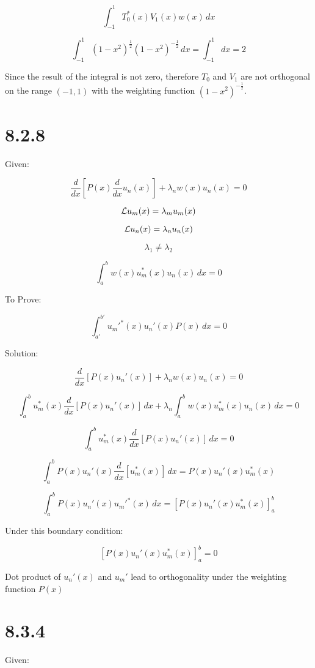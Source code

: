 \documentclass[12pt]{article}
\begin{document}
\[
    \int^1_{-1} T^*_0(x) V_1(x) w(x)\, dx
\]

\[
    \int^1_{-1} {(1-x^2)}^{\frac{1}{2}} {(1-x^2)}^{-\frac{1}{2}}\, dx = \int^1_{-1} dx = 2
\]

Since the result of the integral is not zero, therefore $T_0$ and $V_1$ are not orthogonal on the range $(-1, 1)$ with the weighting function ${(1-x^2)}^{-\frac{1}{2}}$.

\newpage
\section{8.2.8}

Given:

\[
    \frac{d}{dx}\left[P(x)\frac{d}{dx}u_n(x)\right]+\lambda_n w(x)u_n(x)=0
\]

\[
    \mathcal{L} u_m(x) = \lambda_m u_m(x)
\]

\[
    \mathcal{L} u_n(x) = \lambda_n u_n(x)
\]

\[
    \lambda_1 \neq \lambda_2
\]

\[
    \int_a^b w(x)u_m^*(x) u_n(x)\, dx = 0
\]

To Prove:

\[
    \int_{a'}^{b'} {u_m'}^*(x) u_n'(x) P(x)\, dx = 0
\]

Solution:

\[
    \frac{d}{dx}\left[P(x) u_n'(x)\right]+\lambda_n w(x)u_n(x)=0
\]


\[
    \int_{a}^{b} u_m^*(x)\frac{d}{dx}\left[P(x) u_n'(x)\right]\, dx + \lambda_n \int_{a}^{b} w(x)u_m^*(x)u_n(x)\, dx = 0
\]

\[
    \int_{a}^{b} u_m^*(x)\frac{d}{dx}\left[P(x) u_n'(x)\right]\, dx = 0
\]

\[
    \int_{a}^{b}P(x) u_n'(x)\frac{d}{dx}\left[ u_m^*(x)\right]\, dx = P(x) u_n'(x)u_m^*(x)
\]

\[
    \int_{a}^{b}P(x) u_n'(x) {u_m'}^*(x) \, dx = {\left[P(x) u_n'(x)u_m^*(x)\right]}_a^b
\]

Under this boundary condition:

\[
    {\left[P(x) u_n'(x)u_m^*(x)\right]}_a^b = 0
\]

Dot product of $u_n'(x)$ and $u_m'$ lead to orthogonality under the weighting function $P(x)$

\newpage
\section{8.3.4}

Given:
\end{document}
